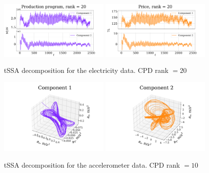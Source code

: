 \documentclass[referee, pdflatex, sn-mathphys-num]{sn-jnl}
\theoremstyle{definition}
\theoremstyle{plain}
\begin{document}
	\begin{figure}[h]
		\centering
		\includegraphics[width=0.48\textwidth, keepaspectratio]{Production program_decomp.png}
		\includegraphics[width=0.48\textwidth, keepaspectratio]{Price_decomp.png}
		\caption{tSSA decomposition for the electricity data. CPD rank $ = 20 $}\label{fig:electr_decomp_tssa}
	\end{figure}
	
	\begin{figure}[h]
		\centering
		\includegraphics[width=0.48\textwidth, 	keepaspectratio]{acceler_1.png}
		\includegraphics[width=0.48\textwidth, keepaspectratio]{acceler_2.png}
		\caption{tSSA decomposition for the accelerometer data. CPD rank $ = 10 $}\label{fig:accel_decomp_tssa}
	\end{figure}
	
\end{document}
